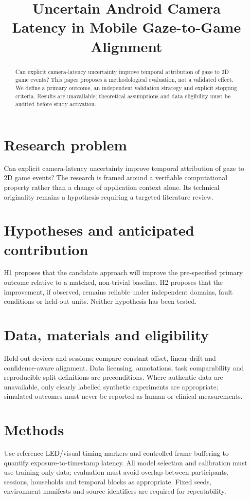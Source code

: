 \documentclass[11pt,a4paper]{article}
\title{Uncertain Android Camera Latency in Mobile Gaze-to-Game Alignment}
\author{}
\date{}
\begin{document}
\maketitle
\begin{abstract}
Can explicit camera-latency uncertainty improve temporal attribution of gaze to 2D game events? This paper proposes a methodological evaluation, not a validated effect. We define a primary outcome, an independent validation strategy and explicit stopping criteria. Results are unavailable; theoretical assumptions and data eligibility must be audited before study activation.
\end{abstract}
\section{Research problem}
Can explicit camera-latency uncertainty improve temporal attribution of gaze to 2D game events? The research is framed around a verifiable computational property rather than a change of application context alone. Its technical originality remains a hypothesis requiring a targeted literature review.
\section{Hypotheses and anticipated contribution}
H1 proposes that the candidate approach will improve the pre-specified primary outcome relative to a matched, non-trivial baseline. H2 proposes that the improvement, if observed, remains reliable under independent domains, fault conditions or held-out units. Neither hypothesis has been tested.
\section{Data, materials and eligibility}
Hold out devices and sessions; compare constant offset, linear drift and confidence-aware alignment. Data licensing, annotations, task comparability and reproducible split definitions are preconditions. Where authentic data are unavailable, only clearly labelled synthetic experiments are appropriate; simulated outcomes must never be reported as human or clinical measurements.
\section{Methods}
Use reference LED/visual timing markers and controlled frame buffering to quantify exposure-to-timestamp latency. All model selection and calibration must use training-only data; evaluation must avoid overlap between participants, sessions, households and temporal blocks as appropriate. Fixed seeds, environment manifests and source identifiers are required for repeatability.
\end{document}
